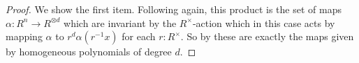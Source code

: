 \begin{proof}
We show the first item. Following \cite{Sym} again, this product is the set of maps $\alpha:R^n\rightarrow R^{\otimes d}$
which are invariant by the $R^\times$-action which in this case acts by mapping $\alpha$ to $r^d\alpha(r^{-1} x)$ for each $r:R^\times$.
So by  these are exactly the maps given by homogeneous polynomials of degree $d$.
\end{proof}
